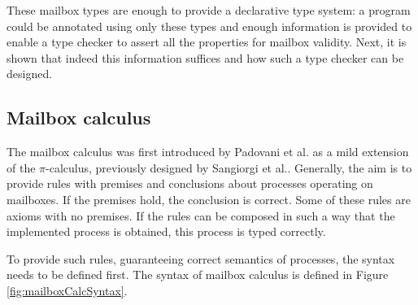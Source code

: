 These mailbox types are enough to provide a declarative type system: a program could be annotated using only these types and enough information is provided to enable a type checker to assert all the properties for mailbox validity. Next, it is shown that indeed this information suffices and how such a type checker can be designed.


\subsection{Mailbox calculus}


The mailbox calculus was first introduced by Padovani et al.\cite{padovaniTypeCheckingAlgorithm2018} as a mild extension of the $\pi$-calculus, previously designed by Sangiorgi et al.\cite{sangiorgiPiCalculusTheoryMobile2003}. Generally, the aim is to provide rules with premises and conclusions about processes operating on mailboxes. If the premises hold, the conclusion is correct. Some of these rules are axioms with no premises. If the rules can be composed in such a way that the implemented process is obtained, this process is typed correctly.

To provide such rules, guaranteeing correct semantics of processes, the syntax needs to be defined first. The syntax of mailbox calculus is defined in Figure \ref{fig:mailboxCalcSyntax}.

